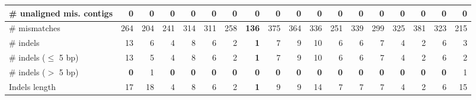 \documentclass[12pt,a4paper]{article}
\begin{document}
\begin{table}[ht]
\begin{center}
\begin{tabular}{|l*{17}{|r}|}
\# unaligned mis. contigs & 0 & 0 & 0 & 0 & 0 & 0 & 0 & 0 & 0 & 0 & 0 & 0 & 0 & 0 & 0 & 0 & 0 \\ \hline
\# mismatches & 264 & 204 & 241 & 314 & 311 & 258 & {\bf 136} & 375 & 364 & 336 & 251 & 339 & 299 & 325 & 381 & 323 & 215 \\ \hline
\# indels & 13 & 6 & 4 & 8 & 6 & 2 & {\bf 1} & 7 & 9 & 10 & 6 & 6 & 7 & 4 & 2 & 6 & 3 \\ \hline
\hspace{5mm}\# indels ($\leq$ 5 bp) & 13 & 5 & 4 & 8 & 6 & 2 & {\bf 1} & 7 & 9 & 10 & 6 & 6 & 7 & 4 & 2 & 6 & 2 \\ \hline
\hspace{5mm}\# indels ($>$ 5 bp) & {\bf 0} & 1 & {\bf 0} & {\bf 0} & {\bf 0} & {\bf 0} & {\bf 0} & {\bf 0} & {\bf 0} & {\bf 0} & {\bf 0} & {\bf 0} & {\bf 0} & {\bf 0} & {\bf 0} & {\bf 0} & 1 \\ \hline
Indels length & 17 & 18 & 4 & 8 & 6 & 2 & {\bf 1} & 9 & 9 & 14 & 7 & 7 & 7 & 4 & 2 & 6 & 15 \\ \hline
\end{tabular}
\end{center}
\end{table}
\end{document}
